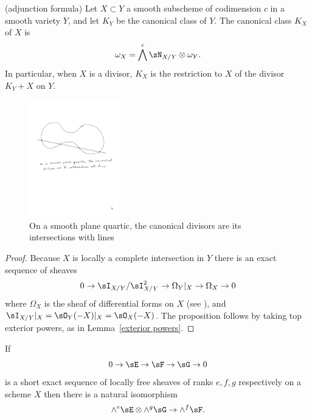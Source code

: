 \begin{proposition}\label{adjunction}(adjunction formula)
 Let $X\subset Y$ a smooth subscheme of codimension $c$ in a smooth variety $Y$, and let $K_{Y}$ be the canonical class of $Y$. The canonical class $K_X$ of $X$ is 
 $$
 \omega_{X} = \bigwedge^{c} \sN_{X/Y} \otimes \omega_{Y}.
 $$
In particular, when $X$ is a divisor, $K_{X}$ is the restriction to $X$ of the divisor $K_{Y}+X$ on $Y$.
\end{proposition}

\begin{figure}
 \caption{On a smooth plane quartic, the canonical divisors are its intersections with lines}
\centerline {\includegraphics[height=2in]{"Fig2.1.pdf"}}
\end{figure}


\begin{proof}
 Because $X$ is locally a complete intersection in $Y$ there is an exact sequence of sheaves
 $$
0\to  \sI_{X/Y}/\sI_{X/Y}^{2} \to \Omega_{Y}| _{X} \to \Omega_{X} \to 0
 $$
 where $\Omega_{X}$ is the sheaf of differential forms on $X$ (see \cite[Proposition 16.3]{Eisenbud95}), and
$ \sI_{X/Y}|_{X} = \sO_{Y}(-X)|_{X} = \sO_{X}(-X)$. The proposition follows by taking top exterior powers, 
as in Lemma~\ref{exterior powers}.\end{proof}

\begin{lemma}\label{exterior powers}
 If 
$$
0\to \sE \to \sF\to \sG \to 0
$$
is a short exact sequence of locally free sheaves of ranks $e,f,g$ respectively on a scheme $X$ then there is a natural
isomorphism 
$$
\wedge^e\sE \otimes \wedge^g \sG \to \wedge^f\sF.
$$
\end{lemma}

